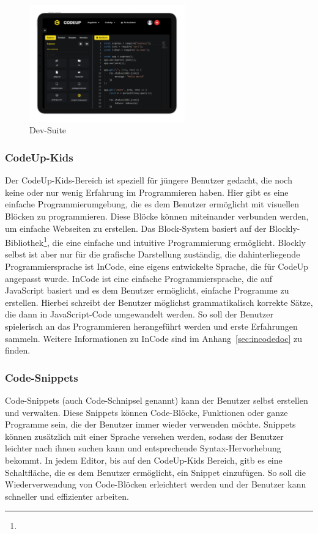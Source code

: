 \documentclass[main.tex]{subfiles}
\begin{document}
    \begin{figure}[h]
        \centering
        \includegraphics[width=0.6\textwidth]{assets/dev-suite}
        \caption{Dev-Suite}
        \label{fig:dev-suite}
    \end{figure}
    \subsubsection{CodeUp-Kids}
    Der CodeUp-Kids-Bereich ist speziell für jüngere Benutzer gedacht, die noch keine oder nur wenig Erfahrung im Programmieren haben.
    Hier gibt es eine einfache Programmierumgebung, die es dem Benutzer ermöglicht mit visuellen Blöcken zu programmieren.
    Diese Blöcke können miteinander verbunden werden, um einfache Webseiten zu erstellen.
    Das Block-System basiert auf der Blockly-Bibliothek\footnote{}, die eine einfache und intuitive Programmierung ermöglicht.
    Blockly selbst ist aber nur für die grafische Darstellung zuständig, die dahinterliegende Programmiersprache ist InCode, eine eigens entwickelte Sprache, die für CodeUp angepasst wurde.
    InCode ist eine einfache Programmiersprache, die auf JavaScript basiert und es dem Benutzer ermöglicht, einfache Programme zu erstellen.
    Hierbei schreibt der Benutzer möglichst grammatikalisch korrekte Sätze, die dann in JavaScript-Code umgewandelt werden.
    So soll der Benutzer spielerisch an das Programmieren herangeführt werden und erste Erfahrungen sammeln.
    Weitere Informationen zu InCode sind im Anhang~\ref{sec:incodedoc} zu finden.
    \subsubsection{Code-Snippets}
    Code-Snippets (auch Code-Schnipsel genannt) kann der Benutzer selbst erstellen und verwalten.
    Diese Snippets können Code-Blöcke, Funktionen oder ganze Programme sein, die der Benutzer immer wieder verwenden möchte.
    Snippets können zusätzlich mit einer Sprache versehen werden, sodass der Benutzer leichter nach ihnen suchen kann und entsprechende Syntax-Hervorhebung bekommt.
    In jedem Editor, bis auf den CodeUp-Kids Bereich, gitb es eine Schaltfläche, die es dem Benutzer ermöglicht, ein Snippet einzufügen.
    So soll die Wiederverwendung von Code-Blöcken erleichtert werden und der Benutzer kann schneller und effizienter arbeiten.
\end{document}
